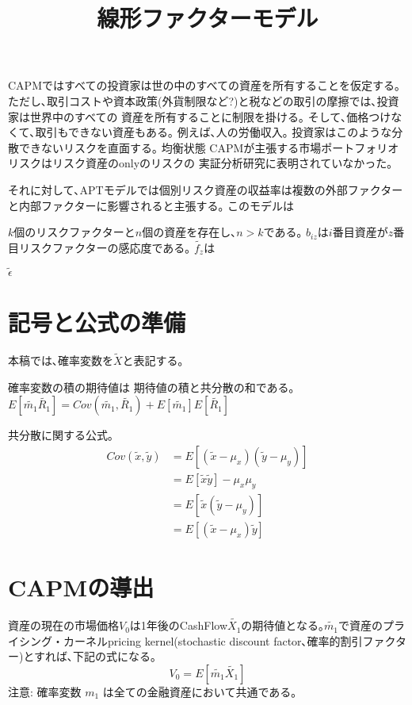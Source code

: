 \documentclass[uplatex,a4paper]{jsarticle}
\title{線形ファクターモデル}
\date{}
\begin{document}
\maketitle

CAPMではすべての投資家は世の中のすべての資産を所有することを仮定する｡
ただし､取引コストや資本政策(外貨制限など?)と税などの取引の摩擦では､投資家は世界中のすべての
資産を所有することに制限を掛ける｡
そして､価格つけなくて､取引もできない資産もある｡
例えば､人の労働収入｡
投資家はこのような分散できないリスクを直面する｡
均衡状態
CAPMが主張する市場ポートフォリオリスクはリスク資産のonlyのリスクの
実証分析研究に表明されていなかった｡

それに対して､APTモデルでは個別リスク資産の収益率は複数の外部ファクターと内部ファクターに影響されると主張する｡
このモデルは

$k$個のリスクファクターと$n$個の資産を存在し､$n>k$である｡
$b_{iz}$は$i$番目資産が$z$番目リスクファクターの感応度である｡
$\tilde{f_{z}}$は

$\tilde{\epsilon}$

\section{記号と公式の準備}
本稿では､確率変数を$\tilde{X}$と表記する｡


確率変数の積の期待値は 期待値の積と共分散の和である｡
$
E [\widetilde{m_1} \widetilde{R_1}] = Cov(\widetilde{m_1}, \widetilde{R_1}) +  E [\widetilde{m_1} ] E [ \widetilde{R_1}]
$

共分散に関する公式｡
\begin{align*}
Cov(\widetilde{x}, \widetilde{y})
& = E[(\widetilde{x} - \mu_x)(\widetilde{y} - \mu_y)]  \\
& = E[\tilde{x} \tilde{y}] - \mu_x \mu_y  \\
& = E[\tilde{x} (\tilde{y} - \mu_y  )]\\
& = E[(\tilde{x} - \mu_x  ) \tilde{y} ]
\end{align*}


\section{CAPMの導出}

資産の現在の市場価格$V_0$は1年後のCashFlow$\widetilde{X_1}$の期待値となる｡$\widetilde{m_1}$で資産のプライシング・カーネルpricing kernel(stochastic discount factor､確率的割引ファクター)とすれば､下記の式になる｡
\begin{equation*}
V_0 = E [\widetilde{m_1} \widetilde{X_1}]
\end{equation*}
注意: 確率変数 $ m_{1}$  は全ての金融資産において共通である｡
\end{document}
